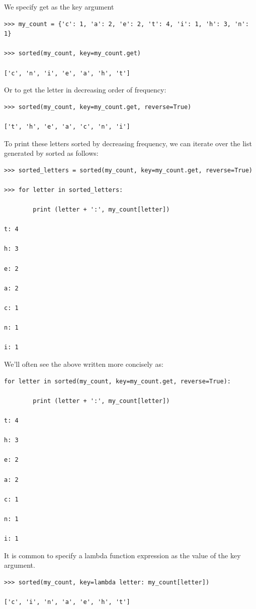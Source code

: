 \documentclass{article}
\begin{document}
We specify get as the key argument

\begin{lstlisting}
>>> my_count = {'c': 1, 'a': 2, 'e': 2, 't': 4, 'i': 1, 'h': 3, 'n': 1}

>>> sorted(my_count, key=my_count.get)

['c', 'n', 'i', 'e', 'a', 'h', 't'] 
\end{lstlisting}

Or to get the letter in decreasing order of frequency:

\begin{lstlisting}
>>> sorted(my_count, key=my_count.get, reverse=True)

['t', 'h', 'e', 'a', 'c', 'n', 'i']
\end{lstlisting}

To print these letters sorted by decreasing frequency, we can iterate over the list generated by sorted as follows:

\begin{lstlisting}
>>> sorted_letters = sorted(my_count, key=my_count.get, reverse=True)

>>> for letter in sorted_letters:

        print (letter + ':', my_count[letter])

t: 4

h: 3

e: 2

a: 2

c: 1

n: 1

i: 1
\end{lstlisting}

We'll often see the above written more concisely as:

\begin{lstlisting}
for letter in sorted(my_count, key=my_count.get, reverse=True):

        print (letter + ':', my_count[letter])

t: 4

h: 3

e: 2

a: 2

c: 1

n: 1

i: 1
\end{lstlisting}

It is common to specify a lambda function expression as the value of the key argument. 

\begin{lstlisting}
>>> sorted(my_count, key=lambda letter: my_count[letter])

['c', 'i', 'n', 'a', 'e', 'h', 't']
\end{lstlisting}
\end{document}
